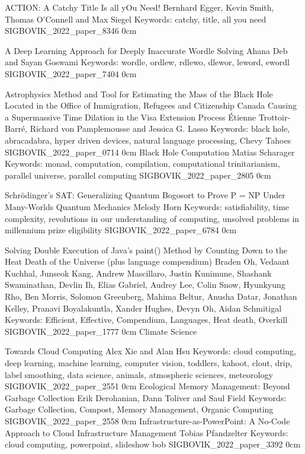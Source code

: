 \addpaper
    {ACTION: A Catchy Title Is all yOu Need!}
    {Bernhard Egger, Kevin Smith, Thomas O'Connell and Max Siegel}
    {Keywords: catchy, title, all you need}
    {SIGBOVIK_2022_paper_8346}
    {0cm}
    {}


\addpaper
    {A Deep Learning Approach for Deeply Inaccurate Wordle Solving}
    {Ahana Deb and Sayan Goswami}
    {Keywords: wordle, ordlew, rdlewo, dlewor, leword, ewordl}
    {SIGBOVIK_2022_paper_7404}
    {0cm}
    {}

\addtrack
    {}{Astrophysics}
\addpaper
    {Method and Tool for Estimating the Mass of the Black Hole Located in the Office of Immigration, Refugees and Citizenship Canada Causing a Supermassive Time Dilation in the Visa Extension Process}
    {Étienne Trottoir-Barré, Richard von Pamplemousse and Jessica G. Lasso}
    {Keywords: black hole, abracadabra, hyper driven devices, natural language processing, Chevy Tahoes}
    {SIGBOVIK_2022_paper_0714}
    {0cm}
    {}
\addpaper
    {Black Hole Computation}
    {Matias Scharager}
    {Keywords: monad, computation, compilation, computational trinitarianism, parallel universe, parallel computing}
    {SIGBOVIK_2022_paper_2805}
    {0cm}
    {}

\addpaper
    {Schrödinger’s SAT: Generalizing Quantum Bogosort to Prove P = NP Under Many-Worlds Quantum Mechanics}
    {Melody Horn}
    {Keywords: satisfiability, time complexity, revolutions in our understanding of computing, unsolved problems in millennium prize eligibility}
    {SIGBOVIK_2022_paper_6784}
    {0cm}
    {}


\addpaper
    {Solving Double Execution of Java’s paint() Method by Counting Down to the Heat Death of the Universe (plus language compendium)}
    {Braden Oh, Vedaant Kuchhal, Junseok Kang, Andrew Mascillaro, Justin Kunimune, Shashank Swaminathan, Devlin Ih, Elias Gabriel, Audrey Lee, Colin Snow, Hyunkyung Rho, Ben Morris, Solomon Greenberg, Mahima Beltur, Anusha Datar, Jonathan Kelley, Pranavi Boyalakuntla, Xander Hughes, Devyn Oh, Aidan Schmitigal}
    {Keywords: Efficient, Effective, Compendium, Languages, Heat death, Overkill}
    {SIGBOVIK_2022_paper_1777}
    {0cm}
    {}
\addtrack
    {}{Climate Science}

\addpaper
    {Towards Cloud Computing}
    {Alex Xie and Alan Hsu}
    {Keywords: cloud computing, deep learning, machine learning, computer vision, toddlers, kahoot, clout, drip, label smoothing, data science, animals, atmospheric sciences, meteorology}
    {SIGBOVIK_2022_paper_2551}
    {0cm}
    {}
\addpaper
    {Ecological Memory Management: Beyond Garbage Collection}
    {Erik Derohanian, Dann Toliver and Saul Field}
    {Keywords: Garbage Collection, Compost, Memory Management, Organic Computing}
    {SIGBOVIK_2022_paper_2558}
    {0cm}
    {}
\addpaper
    {Infrastructure-as-PowerPoint: A No-Code Approach to Cloud Infrastructure Management}
    {Tobias Pfandzelter}
    {Keywords: cloud computing, powerpoint, slideshow bob}
    {SIGBOVIK_2022_paper_3392}
    {0cm}
    {}

